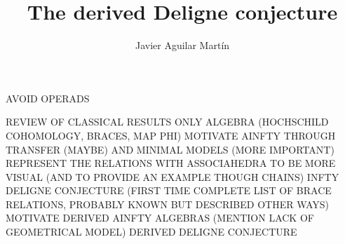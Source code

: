 \documentclass{beamer}
\title{The derived Deligne conjecture}
\author{Javier Aguilar Mart\'in}
\institute{University of Kent}
\date{}
\theoremstyle{definition}
\begin{document}
\frame{\titlepage}

\begin{frame}
AVOID OPERADS

REVIEW OF CLASSICAL RESULTS ONLY ALGEBRA (HOCHSCHILD COHOMOLOGY, BRACES, MAP PHI)
MOTIVATE AINFTY THROUGH TRANSFER (MAYBE) AND MINIMAL MODELS (MORE IMPORTANT)
REPRESENT THE RELATIONS WITH ASSOCIAHEDRA TO BE MORE VISUAL (AND TO PROVIDE AN EXAMPLE THOUGH CHAINS)
INFTY DELIGNE CONJECTURE (FIRST TIME COMPLETE LIST OF BRACE RELATIONS, PROBABLY KNOWN BUT DESCRIBED OTHER WAYS)
MOTIVATE DERIVED AINFTY ALGEBRAS (MENTION LACK OF GEOMETRICAL MODEL)
DERIVED DELIGNE CONJECTURE

\end{frame}
\begin{frame}
\tableofcontents
\end{frame}
\end{document}
